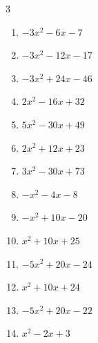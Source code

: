 \begin{multicols}{3}
\begin{enumerate}
  \item $-3x^{2}-6x-7$


  \item $-3x^{2}-12x-17$


  \item $-3x^{2}+24x-46$


  \item $2x^{2}-16x+32$


  \item $5x^{2}-30x+49$


\columnbreak %

  \item $2x^{2}+12x+23$


  \item $3x^{2}-30x+73$


  \item $-x^{2}-4x-8$


  \item $-x^{2}+10x-20$


  \item $x^{2}+10x+25$


  \item $-5x^{2}+20x-24$


  \item $x^{2}+10x+24$


  \item $-5x^{2}+20x-22$


  \item $x^{2}-2x+3$


\end{enumerate}
\end{multicols}
